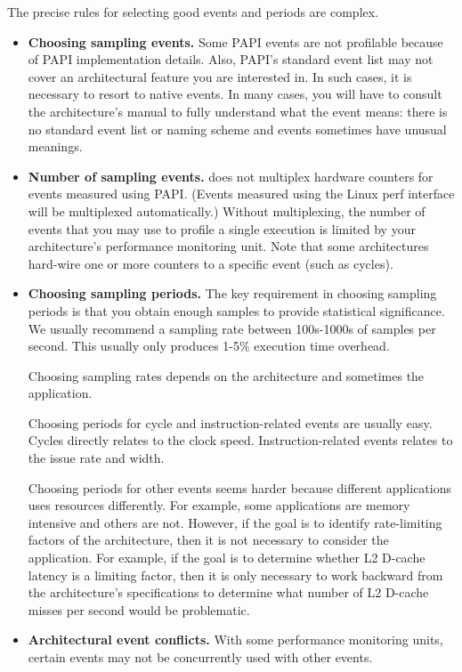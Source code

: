 \documentclass[english]{article}
\begin{document}
The precise rules for selecting good events and periods are complex.
\begin{itemize}

\item \textbf{Choosing sampling events.}
Some PAPI events are not profilable because of PAPI implementation details.
Also, PAPI's standard event list may not cover an architectural feature you are interested in.
In such cases, it is necessary to resort to native events.
In many cases, you will have to consult the architecture's manual to fully understand what the event means: there is no standard event list or naming scheme and events sometimes have unusual meanings.

\item \textbf{Number of sampling events.}
 does not multiplex hardware counters for events measured using PAPI. (Events measured using the Linux
perf interface will be multiplexed automatically.)
Without multiplexing, the number of events that you may use to profile a single execution 
is limited by your architecture's performance monitoring unit.
Note that some architectures hard-wire one or more counters to a specific event (such as cycles).

\item \textbf{Choosing sampling periods.}
The key requirement in choosing sampling periods is that you obtain enough samples to provide statistical significance.
We usually recommend a sampling rate between 100s-1000s of samples per second.
This usually only produces 1-5\% execution time overhead.

Choosing sampling rates depends on the architecture and sometimes the application.

Choosing periods for cycle and instruction-related events are usually easy.
Cycles directly relates to the clock speed.
Instruction-related events relates to the issue rate and width.

Choosing periods for other events seems harder because different applications uses resources differently.
For example, some applications are memory intensive and others are not.
However, if the goal is to identify rate-limiting factors of the architecture, then it is not necessary to consider the application.
For example, if the goal is to determine whether L2 D-cache latency is a limiting factor, then it is only necessary to work backward from the architecture's specifications to determine what number of L2 D-cache misses per second would be problematic.

\item \textbf{Architectural event conflicts.}
With some performance monitoring units, certain events may not be concurrently used with other events.
\end{itemize}
\end{document}
